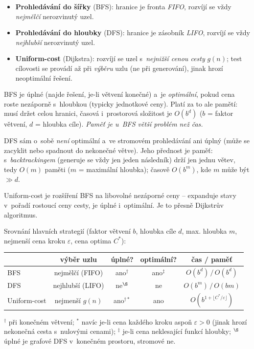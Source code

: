 \begin{definice}
\begin{itemize}
  \item \textbf{Prohledávání do šířky} (BFS): hranice je fronta \emph{FIFO}, rozvíjí se vždy \emph{nejmělčí} nerozvinutý uzel.
  \item \textbf{Prohledávání do hloubky} (DFS): hranice je zásobník \emph{LIFO}, rozvíjí se vždy \emph{nejhlubší} nerozvinutý uzel.
  \item \textbf{Uniform-cost} (Dijkstra): rozvíjí se uzel s~\emph{nejnižší cenou cesty} $g(n)$; test cílovosti se provádí až při \emph{výběru} uzlu (ne při generování), jinak hrozí neoptimální řešení.
\end{itemize}
\end{definice}

\begin{intuice}
BFS je úplné (najde řešení, je-li větvení konečné) a~je \emph{optimální}, pokud cena roste nezáporně s~hloubkou (typicky jednotkové ceny). Platí za to ale pamětí: musí držet celou hranici, časová i~prostorová složitost je $O(b^{d})$ ($b$ = faktor větvení, $d$ = hloubka cíle). \emph{Paměť je u~BFS větší problém než čas.}

DFS sám o~sobě \emph{není} optimální a~ve stromovém prohledávání ani úplný (může se zacyklit nebo spadnout do nekonečné větve). Jeho přednost je paměť: s~\emph{backtrackingem} (generuje se vždy jen jeden následník) drží jen jednu větev, tedy $O(m)$ paměti ($m$ = maximální hloubka); časově $O(b^m)$, kde $m$ může být $\gg d$.

Uniform-cost je rozšíření BFS na libovolné nezáporné ceny -- expanduje stavy v~pořadí rostoucí ceny cesty, je úplné i~optimální. Je to přesně Dijkstrův algoritmus.
\end{intuice}

\begin{poznamka}
Srovnání hlavních strategií (faktor větvení $b$, hloubka cíle $d$, max. hloubka $m$, nejmenší cena kroku $\varepsilon$, cena optima $C^\ast$):
\begin{center}\small
\begin{tabular}{lcccc}
\toprule
 & výběr uzlu & úplné? & optimální? & čas / paměť \\
\midrule
BFS & nejmělčí (FIFO) & ano${}^{\dagger}$ & ano${}^{\ddagger}$ & $O(b^d)\,/\,O(b^d)$ \\
DFS & nejhlubší (LIFO) & ne${}^{\S}$ & ne & $O(b^m)\,/\,O(bm)$ \\
Uniform-cost & nejmenší $g(n)$ & ano${}^{\dagger\ast}$ & ano & $O(b^{1+\lfloor C^\ast/\varepsilon\rfloor})$ \\
\bottomrule
\end{tabular}
\end{center}
${}^{\dagger}$ při konečném větvení; ${}^{\ast}$ navíc je-li cena každého kroku aspoň $\varepsilon>0$ (jinak hrozí nekonečná cesta s~nulovými cenami); ${}^{\ddagger}$ je-li cena neklesající funkcí hloubky; ${}^{\S}$ úplné je grafové DFS v~konečném prostoru, stromové ne.
\end{poznamka}

